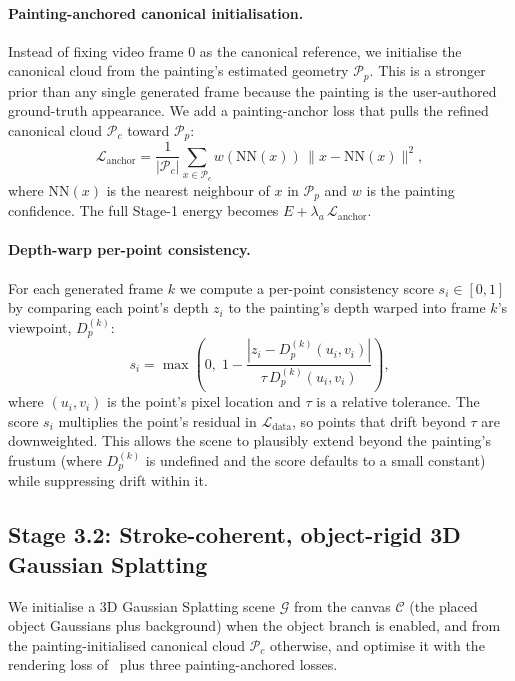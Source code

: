 \paragraph{Painting-anchored canonical initialisation.}
Instead of fixing video frame $0$ as the canonical reference, we initialise
the canonical cloud from the painting's estimated geometry $\mathcal{P}_p$.
This is a stronger prior than any single generated frame because the painting
is the user-authored ground-truth appearance. We add a painting-anchor loss
that pulls the refined canonical cloud $\mathcal{P}_c$ toward $\mathcal{P}_p$:
\begin{equation}
\mathcal{L}_\text{anchor} = \frac{1}{|\mathcal{P}_c|}\sum_{x \in \mathcal{P}_c}
w(\mathrm{NN}(x))\, \|x - \mathrm{NN}(x)\|^2,
\end{equation}
where $\mathrm{NN}(x)$ is the nearest neighbour of $x$ in $\mathcal{P}_p$ and
$w$ is the painting confidence. The full Stage-1 energy becomes
$E + \lambda_a\, \mathcal{L}_\text{anchor}$.

\paragraph{Depth-warp per-point consistency.}
For each generated frame $k$ we compute a per-point consistency score $s_i
\in [0,1]$ by comparing each point's depth $z_i$ to the painting's depth
warped into frame $k$'s viewpoint, $D_p^{(k)}$:
\begin{equation}
s_i = \max\!\left(0,\; 1 - \frac{|z_i - D_p^{(k)}(u_i,v_i)|}
{\tau\, D_p^{(k)}(u_i,v_i)}\right),
\end{equation}
where $(u_i,v_i)$ is the point's pixel location and $\tau$ is a relative
tolerance. The score $s_i$ multiplies the point's residual in
$\mathcal{L}_\text{data}$, so points that drift beyond $\tau$ are
downweighted. This allows the scene to plausibly extend beyond the painting's
frustum (where $D_p^{(k)}$ is undefined and the score defaults to a small
constant) while suppressing drift within it.

\subsection{Stage 3.2: Stroke-coherent, object-rigid 3D Gaussian Splatting}
\label{sec:stage3}

We initialise a 3D Gaussian Splatting scene $\mathcal{G}$
from the canvas $\mathcal{C}$ (the placed object Gaussians plus background)
when the object branch is enabled, and from the painting-initialised
canonical cloud $\mathcal{P}_c$ otherwise, and optimise it with the rendering
loss of~\cite{hoellein2026worldreconstruction} plus three painting-anchored
losses.

